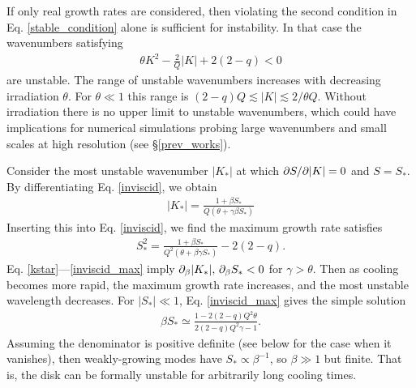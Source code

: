 
If only real growth rates are considered, then violating the second
condition in Eq. \ref{stable_condition} alone is sufficient for instability. 
In that case the wavenumbers satisfying
\begin{align}
  \theta K^2 - \frac{2}{Q}|K| + 2(2-q) < 0 
\end{align}
are unstable. The range of unstable wavenumbers
increases with decreasing irradiation $\theta$. For $\theta\ll 1$ this range is 
$(2-q)Q\lesssim|K|\lesssim2/\theta Q$. Without irradiation there is no
upper limit to unstable wavenumbers, which could have implications for
numerical simulations probing large wavenumbers and small scales 
at high resolution (see \S\ref{prev_works}). 

Consider the most unstable wavenumber $|K_*|$ at which $\partial S/\partial|K| =
0$ and $S = S_*$. By differentiating Eq. \ref{inviscid}, we obtain 
\begin{align}\label{kstar}
  |K_*| = \frac{1+\beta S_*}{Q\left(\theta + \gamma \beta S_*\right)}
\end{align}
Inserting this into Eq. \ref{inviscid}, we find the maximum growth
rate satisfies
\begin{align}\label{inviscid_max}
  S_*^2 = \frac{1+\beta S_*}{Q^2\left(\theta + \beta\gamma S_*\right)}
  - 2(2-q).
\end{align}
Eq. \ref{kstar}---\ref{inviscid_max} imply $\partial_\beta|K_*|,\,\partial_\beta
S_*<0 $ for $\gamma>\theta$. Then as cooling becomes more rapid, the maximum 
growth rate increases, and the most unstable wavelength decreases. 
For $|S_*|\ll1$, Eq. \ref{inviscid_max} gives the simple solution 
\begin{align}
  \beta S_*\simeq \frac{1-2(2-q)Q^2\theta}{2(2-q)Q^2\gamma-1}.  
\end{align} 
Assuming the denominator is positive definite (see below for the case
when it vanishes),  then weakly-growing modes have
$S_*\propto\beta^{-1}$, so $\beta\gg1 $ but finite. That is, the disk
can be formally unstable for arbitrarily long cooling times.    
 

